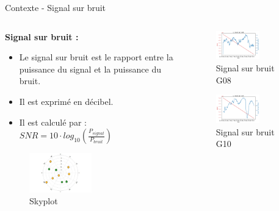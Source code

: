 \documentclass[xcolor=dvipsnames,envcountsect]{beamer}
\begin{document}
\begin{frame}{Contexte - Signal sur bruit}
	\begin{columns}
		\begin{column}{0.5\textwidth}
			\textbf{Signal sur bruit :} 
			\begin{itemize}
				\item Le signal sur bruit est le rapport entre la puissance du signal et la puissance du bruit.
				\item Il est exprimé en décibel.
				\item Il est calculé par : $SNR = 10 \cdot log_{10}(\frac{P_{signal}}{P_{bruit}})$
			\end{itemize}
			\begin{figure}
				\centering
				\includegraphics[width=0.5\textwidth]{./Figures/skyplot.jpg}
				\caption {Skyplot}
			\end{figure}
		\end{column}
		\begin{column}{0.5\textwidth}
			\begin{figure}
				\centering
				\includegraphics[width=0.6\textwidth]{./Figures/G08_L1.png}
				\caption {Signal sur bruit G08}
			\end{figure}
			\begin{figure}
				\centering
				\includegraphics[width=0.6\textwidth]{./Figures/G10_L1.png}
				\caption {Signal sur bruit G10}
			\end{figure}
		\end{column}
	\end{columns}
\end{frame}
\end{document}
